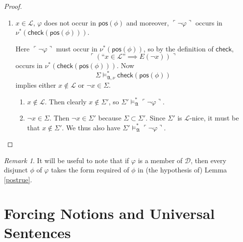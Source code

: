 \documentclass[12pt, twoside]{memoir}
\numberwithin{equation}{section}
\theoremstyle{definition}
\theoremstyle{remark}
\newtheorem{rem}[thm]{Remark}
\theoremstyle{definition}
\theoremstyle{definition}
\theoremstyle{definition}
\theoremstyle{remark}
\begin{document}
\begin{proof}
\begin{enumerate}[label=Case \arabic*:, leftmargin=50pt]
    If $\varphi$ occurs in $\nu^*(\mathsf{pos}(\phi))$ then by the same argument as in \hyperref[5136c2]{Case 2}, $\Sigma \models^*_{\mathfrak{A}} \varphi$ and we have our desired conclusion. Otherwise, $\varphi$ occurs as a subformula of $\nu^*(\varphi')$ for some $\varphi'$ of the form $$\ulcorner (\text{``} x \in \mathcal{L} \text{''} \implies \text{``} E(\neg x) \text{''}) \urcorner \text{,}$$ where $x$ is a variable. By the fact that $$\Sigma \models^*_{\mathfrak{A}, \nu} \mathsf{check}(\mathsf{pos}(\phi)),$$ $\Sigma \models^*_{\mathfrak{A}} \ulcorner \neg \varphi \urcorner$ means $x \not \in \mathcal{L}$, in which case also $\Sigma' \models^*_{\mathfrak{A}} \ulcorner \neg \varphi \urcorner$.
    \item $x \in \mathcal{L}$, $\varphi$ does not occur in $\mathsf{pos}(\phi)$ and moreover, $\ulcorner \neg \varphi \urcorner$ occurs in \\ $\nu^*(\mathsf{check}(\mathsf{pos}(\phi)))$. 
    
    Here $\ulcorner \neg \varphi \urcorner$ must occur in $\nu^*(\mathsf{pos}(\phi))$, so by the definition of $\mathsf{check}$, $$\ulcorner (\text{``} x \in \mathcal{L} \text{''} \implies E(\neg x)) \urcorner$$ occurs in $\nu^*(\mathsf{check}(\mathsf{pos}(\phi)))$. Now $$\Sigma \models^*_{\mathfrak{A}, \nu} \mathsf{check}(\mathsf{pos}(\phi))$$ implies either $x \not \in \mathcal{L}$ or $\neg x \in \Sigma$. 
    \begin{enumerate}[label=Subcase (\alph*):, leftmargin=70pt]
        \item $x \not \in \mathcal{L}$. Then clearly $x \not \in \Sigma'$, so $\Sigma' \models^*_{\mathfrak{A}} \ulcorner \neg \varphi \urcorner$.
        \item $\neg x \in \Sigma$. Then $\neg x \in \Sigma'$ because $\Sigma \subset \Sigma'$. Since $\Sigma'$ is $\mathcal{L}$-nice, it must be that $x \not \in \Sigma'$. We thus also have $\Sigma' \models^*_{\mathfrak{A}} \ulcorner \neg \varphi \urcorner$. \qedhere
    \end{enumerate}
\end{enumerate}
\end{proof}

\begin{rem}\label{rem328}
It will be useful to note that if $\varphi$ is a member of $\mathcal{D}$, then every disjunct $\phi$ of $\varphi$ takes the form required of $\phi$ in (the hypothesis of) Lemma \ref{postrue}.
\end{rem}

\section{Forcing Notions and Universal Sentences}
\end{document}
